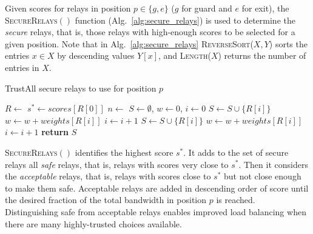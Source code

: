 \documentclass[conference]{styles/IEEEtran}
\begin{document}
Given scores for relays in position $p\in \{g, e\}$ ($g$ for guard and $e$ for exit), the
\textsc{SecureRelays}$()$ function (Alg.~\ref{alg:secure_relays}) is used to determine
the \emph{secure} relays, that is, those relays with high-enough scores to be selected for a given
position. Note that in Alg.~\ref{alg:secure_relays} \textsc{ReverseSort}($X, Y$) sorts the entries
$x\in X$ by descending values $Y[x]$, and \textsc{Length}($X$) returns the number of entries in
$X$.
\begin{algorithm}
\caption{TrustAll secure relays to use for position $p$}
\label{alg:secure_relays}
\begin{algorithmic}[0]
\State $R \gets $ 
\State $s^* \gets scores[R[0]]$ 
\State $n \gets $  
\State $S \gets \emptyset$, $w \gets 0$, $i \gets 0$
  \State $S \gets S \cup \{R[i]\}$
  \State $w\gets w + weights[R[i]]$
  \State $i \gets i + 1$
\EndWhile
{}
  \State $S \gets S \cup \{R[i]\}$
  \State $w\gets w + weights[R[i]]$
  \State $i \gets i + 1$
\EndWhile
\State \textbf{return} $S$
\EndFunction
\end{algorithmic}
\end{algorithm}
\textsc{SecureRelays}$()$ identifies the highest score $s^*$. It adds to the set of secure relays
all \emph{safe} relays, that is, relays with scores very close to $s^*$. Then it considers the
\emph{acceptable} relays, that is, relays with scores close to $s^*$ but not close enough to make
them safe. Acceptable relays are added in descending order of score until the desired fraction of
the total bandwidth in position $p$ is reached. Distinguishing safe from acceptable relays enables
improved load balancing when there are many highly-trusted choices available.
\end{document}
